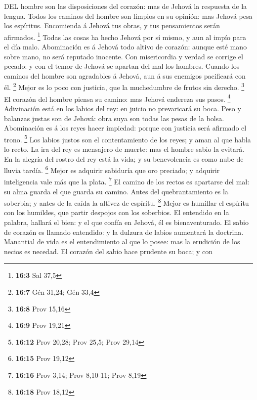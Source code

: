  DEL hombre son las disposiciones del corazón: mas de Jehová
la respuesta de la lengua.  Todos los caminos del hombre son
limpios en su opinión: mas Jehová pesa los espíritus. 
Encomienda á Jehová tus obras, y tus pensamientos serán afirmados.
\footnote{\textbf{16:3} Sal 37,5}  Todas las cosas ha hecho
Jehová por sí mismo, y aun al impío para el día malo. 
Abominación es á Jehová todo altivo de corazón: aunque esté mano sobre
mano, no será reputado inocente.  Con misericordia y verdad
se corrige el pecado: y con el temor de Jehová se apartan del mal los
hombres.  Cuando los caminos del hombre son agradables á
Jehová, aun á sus enemigos pacificará con él. \footnote{\textbf{16:7}
  Gén 31,24; Gén 33,4}  Mejor es lo poco con justicia, que
la muchedumbre de frutos sin derecho. \footnote{\textbf{16:8} Prov 15,16}
 El corazón del hombre piensa su camino: mas Jehová endereza
sus pasos. \footnote{\textbf{16:9} Prov 19,21}  Adivinación
está en los labios del rey: en juicio no prevaricará su boca.
 Peso y balanzas justas son de Jehová: obra suya son todas
las pesas de la bolsa.  Abominación es á los reyes hacer
impiedad: porque con justicia será afirmado el trono. \footnote{\textbf{16:12}
  Prov 20,28; Prov 25,5; Prov 29,14}  Los labios justos son
el contentamiento de los reyes; y aman al que habla lo recto.
 La ira del rey es mensajero de muerte: mas el hombre sabio
la evitará.  En la alegría del rostro del rey está la vida;
y su benevolencia es como nube de lluvia tardía. \footnote{\textbf{16:15}
  Prov 19,12}  Mejor es adquirir sabiduría que oro
preciado; y adquirir inteligencia vale más que la plata. \footnote{\textbf{16:16}
  Prov 3,14; Prov 8,10-11; Prov 8,19}  El camino de los
rectos es apartarse del mal: su alma guarda el que guarda su camino.
 Antes del quebrantamiento es la soberbia; y antes de la
caída la altivez de espíritu. \footnote{\textbf{16:18} Prov 18,12}
 Mejor es humillar el espíritu con los humildes, que partir
despojos con los soberbios.  El entendido en la palabra,
hallará el bien: y el que confía en Jehová, él es bienaventurado.
 El sabio de corazón es llamado entendido: y la dulzura de
labios aumentará la doctrina.  Manantial de vida es el
entendimiento al que lo posee: mas la erudición de los necios es
necedad.  El corazón del sabio hace prudente su boca; y con
